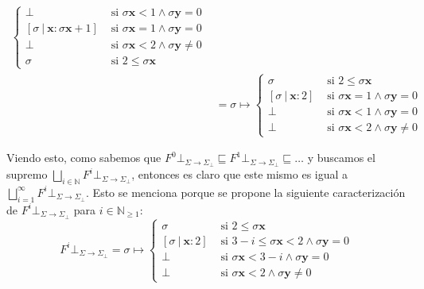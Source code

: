 \documentclass{article}
\newcommand{\N}{\mathbb{N}}
\newcommand{\x}{\textbf{x}}
\newcommand{\y}{\textbf{y}}
\newcommand{\supr}{\bigsqcup\limits}
\newcommand{\fleq}{\sqsubseteq}
\newcommand{\cdom}{\Sigma \to \Sigma_\bot}
\newcommand{\cfbot}{\bot_{\cdom}}
\begin{document}
\begin{equation*}
\begin{aligned}
\begin{cases}
                   \bot &\text{ si }\sigma\x < 1 \land \sigma\y = 0 \\ 
                   [\sigma\ |\ \x : \sigma\x+1] &\text{ si }\sigma\x = 1 \land \sigma\y = 0 \\ 
                   \bot &\text{ si }\sigma\x < 2 \land \sigma\y \neq 0 \\ 
                   \sigma &\text{ si } 2 \leq \sigma\x
                 \end{cases} \\ 
                 &= \sigma \mapsto \begin{cases}
                   \sigma &\text{ si } 2 \leq \sigma\x \\ 
                   [\sigma\ |\ \x : 2] &\text{ si } \sigma\x = 1 \land \sigma\y = 0 \\ 
                   \bot &\text{ si } \sigma\x < 1 \land \sigma\y = 0 \\
                   \bot &\text{ si } \sigma\x < 2 \land \sigma\y \neq 0
                 \end{cases}
  \end{aligned}
\end{equation*}

Viendo esto, como sabemos que $F^0 \cfbot \fleq F^1 \cfbot \fleq \dots$ y buscamos el supremo $\supr_{i \in \N} F^i \cfbot$, entonces es claro que este mismo es igual a $\supr_{i = 1}^\infty F^i \cfbot$.
Esto se menciona porque se propone la siguiente caracterización de $F^i \cfbot$ para $i \in \N_{\geq 1}$:
\begin{equation*}
  F^i \cfbot = \sigma \mapsto \begin{cases}
    \sigma &\text{ si } 2 \leq \sigma\x \\ 
    [\sigma\ |\ \x : 2] &\text{ si } 3-i \leq \sigma\x < 2 \land \sigma\y = 0 \\ 
    \bot &\text{ si } \sigma\x < 3-i \land \sigma\y = 0 \\ 
    \bot &\text{ si } \sigma\x < 2 \land \sigma\y \neq 0 
  \end{cases}
\end{equation*}
\end{document}
